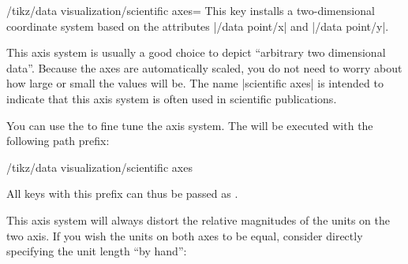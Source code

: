 \begin{key}{/tikz/data visualization/scientific axes=}
    This key installs a two-dimensional coordinate system based on the
    attributes |/data point/x| and |/data point/y|.
\begin{codeexample}[
    width=7cm,
    preamble={\usetikzlibrary{datavisualization.formats.functions}},
]
\end{codeexample}

    This axis system is usually a good choice to depict ``arbitrary two
    dimensional data''. Because the axes are automatically scaled, you do not
    need to worry about how large or small the values will be. The name
    |scientific axes| is intended to indicate that this axis system is often
    used in scientific publications.

    You can use the  to fine tune the axis system. The
     will be executed with the following path prefix:
\begin{codeexample}
/tikz/data visualization/scientific axes
\end{codeexample}
    All keys with this prefix can thus be passed as .

    This axis system will always distort the relative magnitudes of the units
    on the two axis. If you wish the units on both axes to be equal, consider
    directly specifying the unit length ``by hand'':
\begin{codeexample}[preamble={\usetikzlibrary{datavisualization.formats.functions}}]
\end{codeexample}


\end{key}
